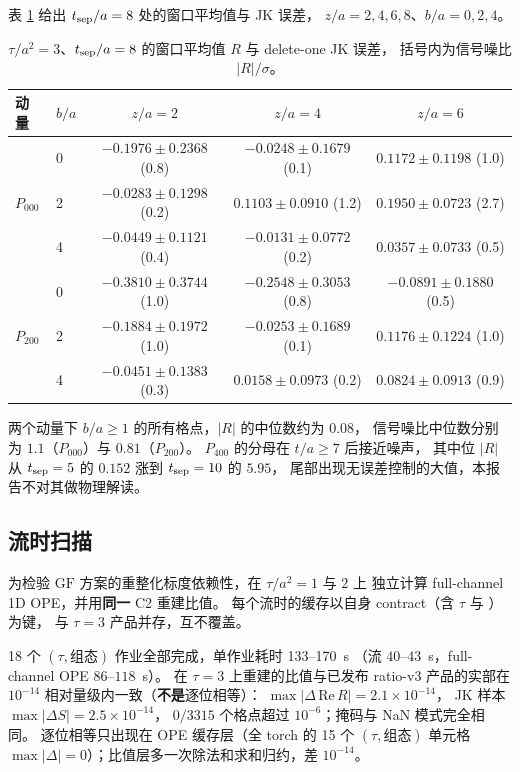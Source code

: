 \documentclass[UTF8,a4paper,11pt]{ctexart}
\newcommand{\code}[1]{\texttt{\detokenize{#1}}}
\newcommand{\GF}{\mathrm{GF}}
\begin{document}
表 \ref{tab:ref} 给出 $t_{\rm sep}/a=8$ 处的窗口平均值与 JK 误差，
$z/a=2,4,6,8$、$b/a=0,2,4$。

\begin{table}[htbp]
\centering
\caption{$\tau/a^2=3$、$t_{\rm sep}/a=8$ 的窗口平均值 $R$ 与 delete-one JK 误差，
括号内为信号噪比 $|R|/\sigma$。}
\label{tab:ref}
\footnotesize
\setlength{\tabcolsep}{3pt}
\begin{tabular}{@{}llccc@{}}
\toprule
动量 & $b/a$ & $z/a=2$ & $z/a=4$ & $z/a=6$ \\
\midrule
\multirow{3}{*}{$P_{000}$}
 & 0 & $-0.1976\pm0.2368$ (0.8) & $-0.0248\pm0.1679$ (0.1) & $0.1172\pm0.1198$ (1.0) \\
 & 2 & $-0.0283\pm0.1298$ (0.2) & $0.1103\pm0.0910$ (1.2)  & $0.1950\pm0.0723$ (2.7) \\
 & 4 & $-0.0449\pm0.1121$ (0.4) & $-0.0131\pm0.0772$ (0.2) & $0.0357\pm0.0733$ (0.5) \\
\midrule
\multirow{3}{*}{$P_{200}$}
 & 0 & $-0.3810\pm0.3744$ (1.0) & $-0.2548\pm0.3053$ (0.8) & $-0.0891\pm0.1880$ (0.5) \\
 & 2 & $-0.1884\pm0.1972$ (1.0) & $-0.0253\pm0.1689$ (0.1) & $0.1176\pm0.1224$ (1.0) \\
 & 4 & $-0.0451\pm0.1383$ (0.3) & $0.0158\pm0.0973$ (0.2)  & $0.0824\pm0.0913$ (0.9) \\
\bottomrule
\end{tabular}
\end{table}

两个动量下 $b/a\ge1$ 的所有格点，$|R|$ 的中位数约为 $0.08$，
信号噪比中位数分别为 $1.1$（$P_{000}$）与 $0.81$（$P_{200}$）。
$P_{400}$ 的分母在 $t/a\ge7$ 后接近噪声，
其中位 $|R|$ 从 $t_{\rm sep}=5$ 的 $0.152$ 涨到 $t_{\rm sep}=10$ 的 $5.95$，
尾部出现无误差控制的大值，本报告不对其做物理解读。

\subsection{流时扫描}
\label{sec:flowscan}

为检验 $\GF$ 方案的重整化标度依赖性，在 $\tau/a^2=1$ 与 $2$ 上
独立计算 full-channel 1D OPE，并用\textbf{同一} C2 重建比值。
每个流时的缓存以自身 contract（含 $\tau$ 与 \code{staple_length}）为键，
与 $\tau=3$ 产品并存，互不覆盖。

18 个 $(\tau,\text{组态})$ 作业全部完成，单作业耗时 133--170~s
（流 $40$--$43$~s，full-channel OPE $86$--$118$~s）。
在 $\tau=3$ 上重建的比值与已发布 ratio-v3 产品的实部在
$10^{-14}$ 相对量级内一致（\textbf{不是}逐位相等）：
$\max|\Delta\,\mathrm{Re}\,R|=2.1\times10^{-14}$，
JK 样本 $\max|\Delta S|=2.5\times10^{-14}$，
$0/3315$ 个格点超过 $10^{-6}$；掩码与 NaN 模式完全相同。
逐位相等只出现在 OPE 缓存层（全 torch 的 15 个 $(\tau,\text{组态})$
单元格 $\max|\Delta|=0$）；比值层多一次除法和求和归约，差 $10^{-14}$。
\end{document}

